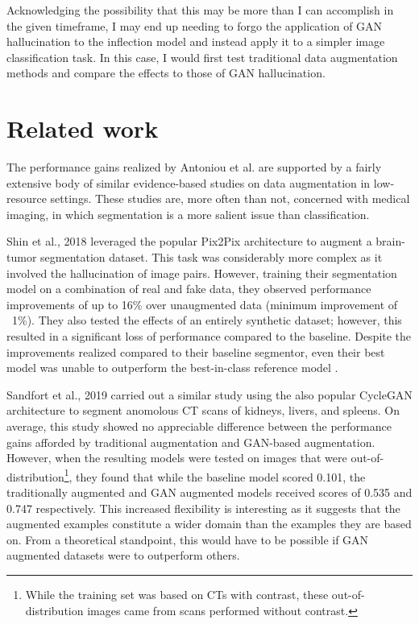 \documentclass{article}
\begin{document}
  Acknowledging the possibility that this may be more than I can accomplish in the given timeframe, I may end up needing to forgo the application of GAN hallucination to the inflection model and instead apply it to a simpler image classification task. In this case, I would first test traditional data augmentation methods and compare the effects to those of GAN hallucination.

  \section{Related work}
    The performance gains realized by Antoniou et al. \cite{antoniou} are supported by a fairly extensive body of similar evidence-based studies on data augmentation in low-resource settings. These studies are, more often than not, concerned with medical imaging, in which segmentation is a more salient issue than classification.
    
    Shin et al., 2018 \cite{shin} leveraged the popular Pix2Pix \cite{pix2pix} architecture to augment a brain-tumor segmentation dataset. This task was considerably more complex as it involved the hallucination of image pairs. However, training their segmentation model on a combination of real and fake data, they observed performance improvements of up to 16\% over unaugmented data (minimum improvement of ~1\%). They also tested the effects of an entirely synthetic dataset; however, this resulted in a significant loss of performance compared to the baseline. Despite the improvements realized compared to their baseline segmentor, even their best model was unable to outperform the best-in-class reference model \cite{wang}.

    Sandfort et al., 2019 \cite{sandfort} carried out a similar study using the also popular CycleGAN architecture \cite{cyclegan} to segment anomolous CT scans of kidneys, livers, and spleens. On average, this study showed no appreciable difference between the performance gains afforded by traditional augmentation and GAN-based augmentation. However, when the resulting models were tested on images that were out-of-distribution\footnote{While the training set was based on CTs with contrast, these out-of-distribution images came from scans performed without contrast.}, they found that while the baseline model scored 0.101, the traditionally augmented and GAN augmented models received scores of 0.535 and 0.747 respectively. This increased flexibility is interesting as it suggests that the augmented examples constitute a wider domain than the examples they are based on. From a theoretical standpoint, this would have to be possible if GAN augmented datasets were to outperform others.
\end{document}
